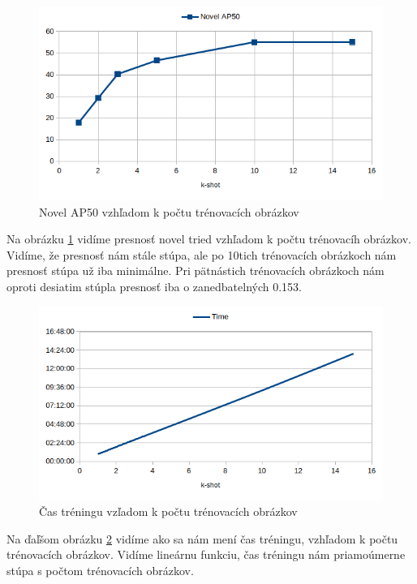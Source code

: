\begin{figure}[H]
\includegraphics[width=\textwidth]{images/results_novel_AP50.png}
\centering
\caption{Novel AP50 vzhľadom k počtu trénovacích obrázkov}
\label{fig:image37}
\end{figure}

Na obrázku \ref{fig:image37} vidíme presnosť novel tried vzhľadom k počtu trénovacíh obrázkov. Vidíme, že presnosť nám stále stúpa, ale po 10tich trénovacích obrázkoch nám presnosť stúpa už iba minimálne. Pri pätnástich trénovacích obrázkoch nám oproti desiatim stúpla presnosť iba o zanedbatelných 0.153.

\begin{figure}[H]
\includegraphics[width=\textwidth]{images/results_time.png}
\centering
\caption{Čas tréningu vzľadom k počtu trénovacích obrázkov}
\label{fig:image38}
\end{figure}

Na ďaľšom obrázku \ref{fig:image38} vidíme ako sa nám mení čas tréningu, vzhľadom k počtu trénovacích obrázkov. Vidíme lineárnu funkciu, čas tréningu nám priamoúmerne stúpa s počtom trénovacích obrázkov.

